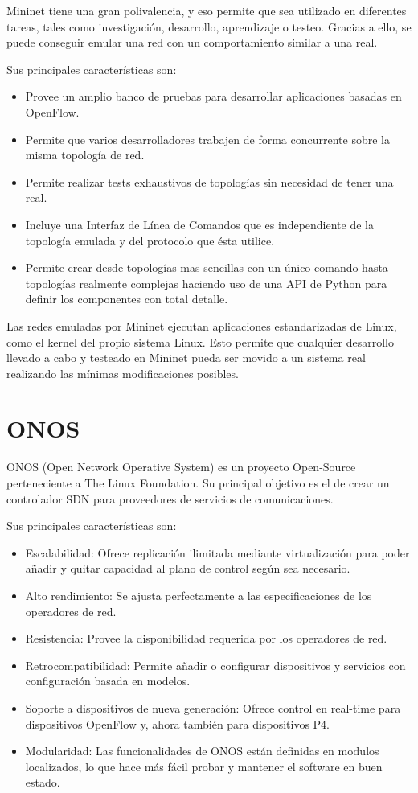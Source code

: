 Mininet tiene una gran polivalencia, y eso permite que sea utilizado en diferentes tareas, tales como investigación, desarrollo, aprendizaje o testeo. Gracias a ello, se puede conseguir emular una red con un comportamiento similar a una real.

Sus principales características son:
\begin{itemize}
	\item Provee un amplio banco de pruebas para desarrollar aplicaciones basadas en OpenFlow.
	\item Permite que varios desarrolladores trabajen de forma concurrente sobre la misma topología de red.
	\item Permite realizar tests exhaustivos de topologías sin necesidad de tener una real.
	\item Incluye una Interfaz de Línea de Comandos que es independiente de la topología emulada y del protocolo que ésta utilice.
	\item Permite crear desde topologías mas sencillas con un único comando hasta topologías realmente complejas haciendo uso de una API de Python para definir los componentes con total detalle.
\end{itemize}

Las redes emuladas por Mininet ejecutan aplicaciones estandarizadas de Linux, como el kernel del propio sistema Linux. Esto permite que cualquier desarrollo llevado a cabo y testeado en Mininet pueda ser movido a un sistema real realizando las mínimas modificaciones posibles.

\section{ONOS}
\label{sec:onos}

ONOS (Open Network Operative System) es un proyecto Open-Source perteneciente a The Linux Foundation. Su principal objetivo es el de crear un controlador SDN para proveedores de servicios de comunicaciones.

Sus principales características son:
\begin{itemize}
	\item Escalabilidad: Ofrece replicación ilimitada mediante virtualización para poder añadir y quitar capacidad al plano de control según sea necesario.
	\item Alto rendimiento: Se ajusta perfectamente a las especificaciones de los operadores de red.
	\item Resistencia: Provee la disponibilidad requerida por los operadores de red.
	\item Retrocompatibilidad: Permite añadir o configurar dispositivos y servicios con configuración basada en modelos.
	\item Soporte a dispositivos de nueva generación: Ofrece control en real-time para dispositivos OpenFlow y, ahora también para dispositivos P4.
	\item Modularidad: Las funcionalidades de ONOS están definidas en modulos localizados, lo que hace más fácil probar y mantener el software en buen estado.
\end{itemize}


